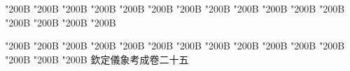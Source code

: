 \begin{正文}
\char"200B\relax{}
\char"200B\relax{}
\char"200B\relax{}
\char"200B\relax{}
\char"200B\relax{}
\char"200B\relax{}
\char"200B\relax{}
\char"200B\relax{}
\char"200B\relax{}
\char"200B\relax{}
\char"200B\relax{}
\char"200B\relax{}
\char"200B\relax{}
\char"200B\relax{}
\char"200B\relax{}
\char"200B\relax
{}\par
\end{正文}\clearpage
{}
\begin{正文}
\char"200B\relax{}
\char"200B\relax{}
\char"200B\relax{}
\char"200B\relax{}
\char"200B\relax{}
\char"200B\relax{}
\char"200B\relax{}
\char"200B\relax{}
\char"200B\relax{}
\char"200B\relax{}
\char"200B\relax{}
\char"200B\relax{}
\char"200B\relax{}
\char"200B\relax{}
\char"200B\relax{}
欽定儀象考成卷二十五
\par

\par\end{正文}\clearpage
